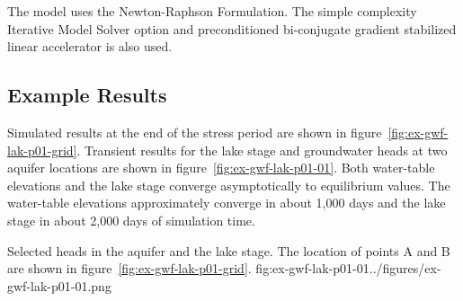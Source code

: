 The model uses the Newton-Raphson Formulation. The simple complexity Iterative Model Solver option and preconditioned bi-conjugate gradient stabilized linear accelerator is also used.

\subsection{Example Results}

Simulated results at the end of the stress period are shown in figure~\ref{fig:ex-gwf-lak-p01-grid}. Transient results for the lake stage and groundwater heads at two aquifer locations are shown in figure~\ref{fig:ex-gwf-lak-p01-01}. Both water-table elevations and the lake stage converge asymptotically to equilibrium values. The water-table elevations approximately converge in about 1,000 days and the lake stage in about 2,000 days of simulation time.

\begin{StandardFigure}{
                                     Selected heads in the aquifer and the lake stage. The location of points A
                                     and B are shown in figure~\ref{fig:ex-gwf-lak-p01-grid}.
                                     }{fig:ex-gwf-lak-p01-01}{../figures/ex-gwf-lak-p01-01.png}
\end{StandardFigure}                                 
